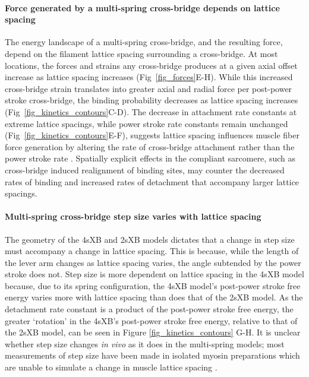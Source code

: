 \documentclass[10pt]{article}
\newcommand{\citep}[1]{\cite{#1}} %
\begin{document}
\paragraph{Force generated by a multi-spring cross-bridge depends on lattice spacing} %
The energy landscape of a multi-spring cross-bridge, and the resulting force, depend on the filament lattice spacing surrounding a cross-bridge. 
At most locations, the forces and strains any cross-bridge produces at a given axial offset increase as lattice spacing increases (Fig~\ref{fig_forces}E-H). 
While this increased cross-bridge strain translates into greater axial and radial force per post-power stroke cross-bridge, the binding probability decreases as lattice spacing increases (Fig~\ref{fig_kinetics_contours}C-D).
The decrease in attachment rate constants at extreme lattice spacings, while power stroke rate constants remain unchanged (Fig~\ref{fig_kinetics_contours}E-F), suggests lattice spacing influences muscle fiber force generation by altering the rate of cross-bridge attachment rather than the power stroke rate \citep{Martyn2004}. 
Spatially explicit effects in the compliant sarcomere, such as cross-bridge induced realignment of binding sites, may counter the decreased rates of binding and increased rates of detachment that accompany larger lattice spacings.

\paragraph{Multi-spring cross-bridge step size varies with lattice spacing} %
The geometry of the 4sXB and 2sXB models dictates that a change in step size must accompany a change in lattice spacing. 
This is because, while the length of the lever arm changes as lattice spacing varies, the angle subtended by the power stroke does not. 
Step size is more dependent on lattice spacing in the 4sXB model because, due to its spring configuration, the 4sXB model's post-power stroke free energy varies more with lattice spacing than does that of the 2sXB model. 
As the detachment rate constant is a product of the post-power stroke free energy, the greater `rotation' in the 4sXB's post-power stroke free energy, relative to that of the 2sXB model, can be seen in Figure \ref{fig_kinetics_contours} G-H. 
It is unclear whether step size changes \textit{in vivo} as it does in the multi-spring models; most measurements of step size have been made in isolated myosin preparations which are unable to simulate a change in muscle lattice spacing \citep{HowardBook, Peterman2004}. 
\end{document}
